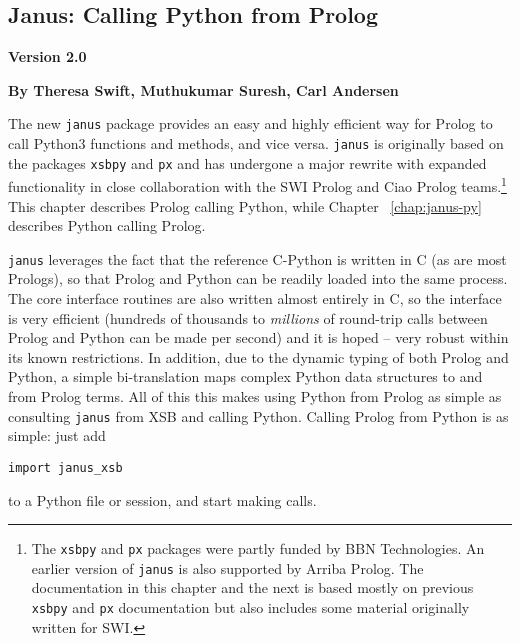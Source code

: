 \newcommand{\janus}{{\tt janus}}
\newcommand{\janusplg}{\texttt{janus-plg}}
\newcommand{\januspy}{\texttt{janus-py}}
\newcommand{\janusxsb}{\texttt{janus\_xsb}}
\newcommand{\jnsversion}{Version 2.0}

\begin{center}
\chapter[Janus: Prolog calling Python]{Janus: Calling Python from Prolog} \label{chap:januspy}
\end{center}

\vspace*{-.30in} 
\begin{center}
{\Large {\bf  \jnsversion}}
\end{center}

\begin{center}
  {\Large {\bf By Theresa Swift, Muthukumar Suresh, Carl Andersen}}
\end{center}

\noindent

%

The new \janus{} package provides an easy and highly efficient way for
Prolog to call Python3 functions and methods, and vice versa.
\janus{} is originally based on the packages {\tt xsbpy} and {\tt px}
\cite{SwiA23,AndS23} and has undergone a major rewrite with expanded
functionality in close collaboration with the SWI Prolog and Ciao
Prolog teams.\footnote{The {\tt xsbpy} and {\tt px} packages were
partly funded by BBN Technologies. An earlier version of \janus{} is
also supported by Arriba Prolog. The documentation in this chapter and
the next is based mostly on previous {\tt xsbpy} and {\tt px}
documentation but also includes some material originally written for
SWI.} This chapter describes Prolog calling Python, while Chapter
~\ref{chap:janus-py} describes Python calling Prolog.

\janus{} leverages the fact that the reference C-Python is written in
C (as are most Prologs), so that Prolog and Python can be readily
loaded into the same process. The core interface routines are also
written almost entirely in C, so the interface is very efficient
(hundreds of thousands to {\em millions} of round-trip calls between
Prolog and Python can be made per second) and it is hoped -- very
robust within its known restrictions.  In addition, due to the dynamic
typing of both Prolog and Python, a simple bi-translation maps complex
Python data structures to and from Prolog terms.  All of this this
makes using Python from Prolog as simple as consulting \janus{} from
XSB and calling Python.  Calling Prolog from Python is as simple: just add
\begin{verbatim}
import janus_xsb
\end{verbatim}
to a Python file or session, and start making calls.

